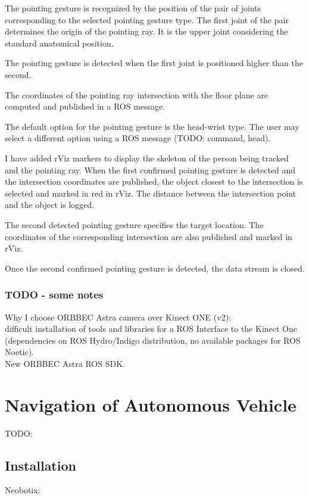 The pointing gesture is recognized by the position of the pair of joints corresponding to the selected pointing gesture type. The first joint of the pair determines the origin of the pointing ray. It is the upper joint considering the standard anatomical position.\par
The pointing gesture is detected when the first joint is positioned higher than the second.\par
The coordinates of the pointing ray intersection with the floor plane are computed and published in a ROS message.\par
The default option for the pointing gesture is the head-wrist type. The user may select a different option using a ROS message (TODO: command, head).\par

I have added rViz markers to display the skeleton of the person being tracked and the pointing ray. When the first confirmed pointing gesture is detected and the intersection coordinates are published, the object closest to the intersection is selected and marked in red in rViz. The distance between the intersection point and the object is logged.\par
The second detected pointing gesture specifies the target location. The coordinates of the corresponding intersection are also published and marked in rViz.\par
Once the second confirmed pointing gesture is detected, the data stream is closed.\par


\subsubsection{TODO - some notes}
Why I choose ORBBEC Astra camera over Kinect ONE (v2):\\
difficult installation of tools and libraries for a ROS Interface to the Kinect One (dependencies on ROS Hydro/Indigo distribution, no available packages for ROS Noetic).\\
New ORBBEC Astra ROS SDK.\\

\section{Navigation of Autonomous Vehicle}
TODO:\\
\subsection{Installation}
Neobotix:

